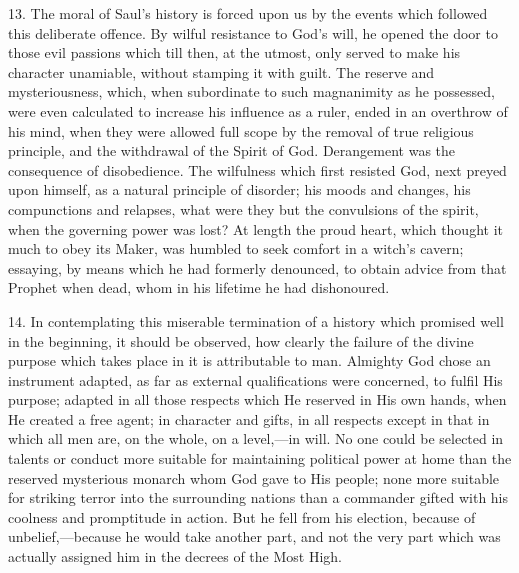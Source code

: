 13. The moral of Saul's history is forced upon us by the events
which followed this deliberate offence. By wilful resistance to God's
will, he opened the door to those evil passions which till then, at
the utmost, only served to make his character unamiable, without
stamping it with guilt. The reserve and mysteriousness, which, when
subordinate to such magnanimity as he possessed, were even calculated
to increase his influence as a ruler, ended in an overthrow of his
mind, when they were allowed full scope by the removal of true
religious principle, and the withdrawal of the Spirit of God.
Derangement was the consequence of disobedience. The wilfulness which
first resisted God, next preyed upon himself, as a natural principle
of disorder; his moods and changes, his compunctions and relapses,
what were they but the convulsions of the spirit, when the governing
power was lost? At length the proud heart, which thought it much to
obey its Maker, was humbled to seek comfort in a witch's cavern;
essaying, by means which he had formerly denounced, to obtain advice
from that Prophet when dead, whom in his lifetime he had dishonoured.

14. In contemplating this miserable termination of a history which
promised well in the beginning, it should be observed, how clearly the
failure of the divine purpose which takes place in it is attributable
to man. Almighty God chose an instrument adapted, as far as external
qualifications were concerned, to fulfil His purpose; adapted in all
those respects which He reserved in His own hands, when He created a
free agent; in character and gifts, in all respects except in that in
which all men are, on the whole, on a level,—in will. No one could
be selected in talents or conduct more suitable for maintaining
political power at home than the reserved mysterious monarch whom God
gave to His people; none more suitable for striking terror into the
surrounding nations than a commander gifted with his coolness and
promptitude in action. But he fell from his election, because of
unbelief,—because he would take another part, and not the very part
which was actually assigned him in the decrees of the Most High.

